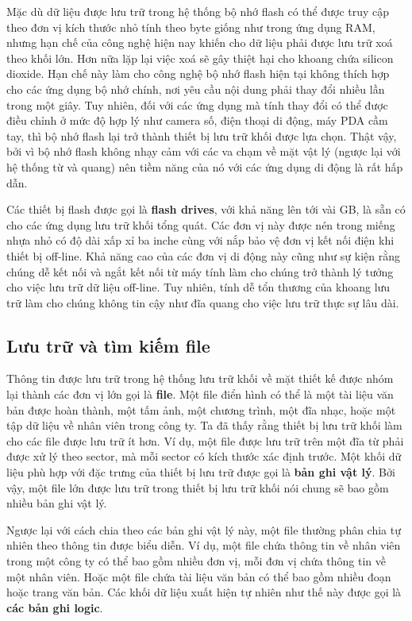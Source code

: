 Mặc dù dữ liệu được lưu trữ trong hệ thống bộ nhớ flash có thể được truy cập theo đơn vị
kích thước nhỏ tính theo byte giống như trong ứng dụng RAM, nhưng hạn chế của công nghệ
hiện nay khiến cho dữ liệu phải được lưu trữ xoá theo khối lớn. Hơn nữa lặp lại việc xoá
sẽ gây thiệt hại cho khoang chứa silicon dioxide. Hạn chế này làm cho công nghệ bộ nhớ
flash hiện tại không thích hợp cho các ứng dụng bộ nhớ chính, nơi yêu cầu nội dung phải
thay đổi nhiều lần trong một giây. Tuy nhiên, đối với các ứng dụng mà tính thay đổi có thể
được điều chỉnh ở mức độ hợp lý như camera số, điện thoại di động, máy PDA cầm tay, thì bộ
nhớ flash lại trở thành thiết bị lưu trữ khối được lựa chọn. Thật vậy, bởi vì bộ nhớ flash
không nhạy cảm với các va chạm về mặt vật lý (ngược lại với hệ thống từ và quang) nên tiềm
năng của nó với các ứng dụng di động là rất hấp dẫn.

Các thiết bị flash được gọi là \textbf{flash drives}, với khả năng lên tới vài GB, là sẵn
có cho các ứng dụng lưu trữ khối tổng quát. Các đơn vị này được nén trong miếng nhựa nhỏ
có độ dài xấp xỉ ba inche cùng với nắp bảo vệ đơn vị kết nối điện khi thiết bị
off-line. Khả năng cao của các đơn vị di động này cũng như sự kiện rằng chúng dễ kết nối
và ngắt kết nối từ máy tính làm cho chúng trở thành lý tưởng cho việc lưu trữ dữ liệu
off-line. Tuy nhiên, tính dễ tổn thương của khoang lưu trữ làm cho chúng không tin cậy như
đĩa quang cho việc lưu trữ thực sự lâu dài.

\subsection*{Lưu trữ và tìm kiếm file}

Thông tin được lưu trữ trong hệ thống lưu trữ khối về mặt thiết kế được nhóm lại thành các
đơn vị lớn gọi là \textbf{file}. Một file điển hình có thể là một tài liệu văn bản được
hoàn thành, một tấm ảnh, một chương trình, một đĩa nhạc, hoặc một tập dữ liệu về nhân viên
trong công ty. Ta đã thấy rằng thiết bị lưu trữ khối làm cho các file được lưu trữ ít
hơn. Ví dụ, một file được lưu trữ trên một đĩa từ phải được xử lý theo sector, mà mỗi
sector có kích thước xác định trước. Một khối dữ liệu phù hợp với đặc trưng của thiết bị
lưu trữ được gọi là \textbf{bản ghi vật lý}. Bởi vậy, một file lớn được lưu trữ trong
thiết bị lưu trữ khối nói chung sẽ bao gồm nhiều bản ghi vật lý.

Ngược lại với cách chia theo các bản ghi vật lý này, một file thường phân chia tự nhiên
theo thông tin được biểu diễn. Ví dụ, một file chứa thông tin về nhân viên trong một công
ty có thể bao gồm nhiều đơn vị, mỗi đơn vị chứa thông tin về một nhân viên. Hoặc một file
chứa tài liệu văn bản có thể bao gồm nhiều đoạn hoặc trang văn bản. Các khối dữ liệu xuất
hiện tự nhiên như thế này được gọi là \textbf{các bản ghi logic}.


